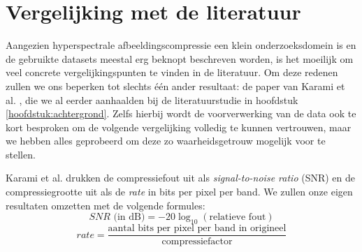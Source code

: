 \section{Vergelijking met de literatuur}

Aangezien hyperspectrale afbeeldingscompressie een klein onderzoeksdomein is en de gebruikte datasets meestal erg beknopt beschreven worden, is het moeilijk om veel concrete vergelijkingspunten te vinden in de literatuur. Om deze redenen zullen we ons beperken tot slechts \'e\'en ander resultaat: de paper van Karami et al. \cite{ref:karami}, die we al eerder aanhaalden bij de literatuurstudie in hoofdstuk \ref{hoofdstuk:achtergrond}. Zelfs hierbij wordt de voorverwerking van de data ook te kort besproken om de volgende vergelijking volledig te kunnen vertrouwen, maar we hebben alles geprobeerd om deze zo waarheidsgetrouw mogelijk voor te stellen.

\newpage
Karami et al. drukken de compressiefout uit als \textit{signal-to-noise ratio} (SNR) en de compressiegrootte uit als de \textit{rate} in bits per pixel per band. We zullen onze eigen resultaten omzetten met de volgende formules:
\[
SNR \text{ (in dB)} = -20 \log_{10}(\text{relatieve fout})
\]
\[
rate = \frac{\text{aantal bits per pixel per band in origineel}}{\text{compressiefactor}}
\]

